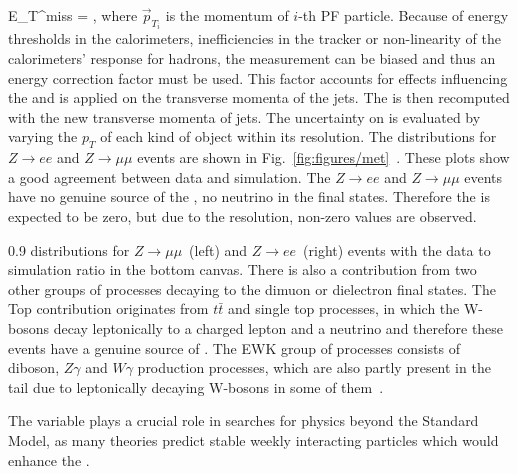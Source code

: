 {
E_{T}^{miss} = ,
}
where $\vec{p}_{T_{i}}$ is the momentum of $i$-th PF particle. Because of energy thresholds in the calorimeters, inefficiencies in the tracker or non-linearity of the calorimeters' response for hadrons, the \MET measurement can be biased and thus an energy correction factor must be used. This factor accounts for effects influencing the \MET and is applied on the transverse momenta of the jets. The \MET is then recomputed with the new transverse momenta of jets. The uncertainty on \MET is evaluated by varying the $p_{T}$ of each kind of object within its resolution. The  \MET  distributions for  $Z \rightarrow ee$ and $Z \rightarrow \mu \mu$ events are shown in Fig.~\ref{fig:figures/met}~\cite{CMS:2016ljj}. These plots show a good agreement between data and simulation. The $Z \rightarrow ee$ and $Z \rightarrow \mu \mu$ events have no genuine source of the \MET , no neutrino in the final states. Therefore the \MET is expected to be zero, but due to the \MET resolution, non-zero values are observed.  


                 {0.9}       %
                 { \MET distributions for $Z \rightarrow \mu \mu$~(left) and $Z \rightarrow ee$~(right) events with the data to simulation ratio in the bottom canvas. There is also a contribution from two other groups of processes decaying to the dimuon or dielectron final states. The Top contribution originates from $t\bar{t}$ and single top processes, in which the W-bosons decay leptonically to a charged lepton and a neutrino and therefore these events have a genuine source of \MET. The EWK group of processes consists of diboson, $Z\gamma$ and $W\gamma$ production processes, which are also partly present in the \MET tail due to leptonically decaying W-bosons in some of them~\cite{CMS:2016ljj}. }

The \MET variable plays a crucial role in searches for physics beyond the Standard Model, as many theories predict stable weekly interacting particles which would enhance the \MET.



